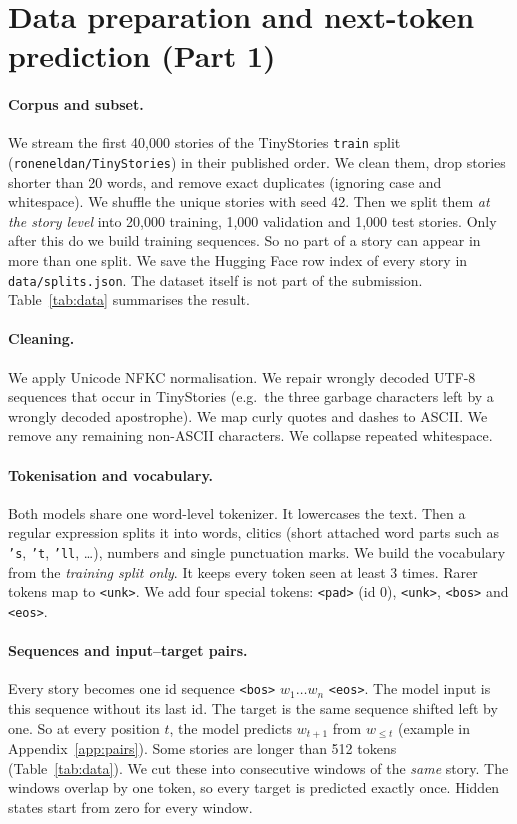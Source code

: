 \documentclass[11pt,a4paper]{article}
\begin{document}
\section{Data preparation and next-token prediction (Part 1)}
\label{sec:data}
\paragraph{Corpus and subset.} We stream the first 40,000 stories of the TinyStories
\texttt{train} split (\texttt{roneneldan/\allowbreak TinyStories}) in their published order. We clean them,
drop stories shorter than 20 words, and remove exact duplicates (ignoring case and whitespace).
We shuffle the unique stories with seed 42. Then we split them \emph{at the story level} into 20,000
training, 1,000 validation and 1,000 test stories. Only after this do we build training sequences. So no
part of a story can appear in more than one split. We save the Hugging Face row index of every story
in \texttt{data/splits.json}. The dataset itself is not part of the submission.
Table~\ref{tab:data} summarises the result.

\paragraph{Cleaning.} We apply Unicode NFKC normalisation. We repair wrongly decoded UTF-8 sequences that occur
in TinyStories (e.g.\ the three garbage characters left by a wrongly decoded apostrophe). We map curly quotes and dashes to ASCII.
We remove any remaining non-ASCII characters. We collapse repeated whitespace.

\paragraph{Tokenisation and vocabulary.} Both models share one word-level tokenizer. It
lowercases the text. Then a regular expression splits it into words, clitics (short attached word parts such as \texttt{'s}, \texttt{'t},
\texttt{'ll}, \dots), numbers and single punctuation marks. We build the vocabulary from the
\emph{training split only}. It keeps every token seen at least 3 times. Rarer tokens map to
\texttt{<unk>}. We add four special tokens: \texttt{<pad>} (id 0), \texttt{<unk>},
\texttt{<bos>} and \texttt{<eos>}.

\paragraph{Sequences and input--target pairs.} Every story becomes one id sequence
\texttt{<bos>} $w_1 \dots w_n$ \texttt{<eos>}. The model input is this sequence without its last id.
The target is the same sequence shifted left by one. So at every position $t$, the model predicts
$w_{t+1}$ from $w_{\le t}$ (example in Appendix~\ref{app:pairs}). Some stories are longer than 512 tokens
(Table~\ref{tab:data}). We cut these into consecutive windows of the \emph{same} story. The windows overlap by one
token, so every target is predicted exactly once. Hidden states start from zero for every window.
\end{document}
